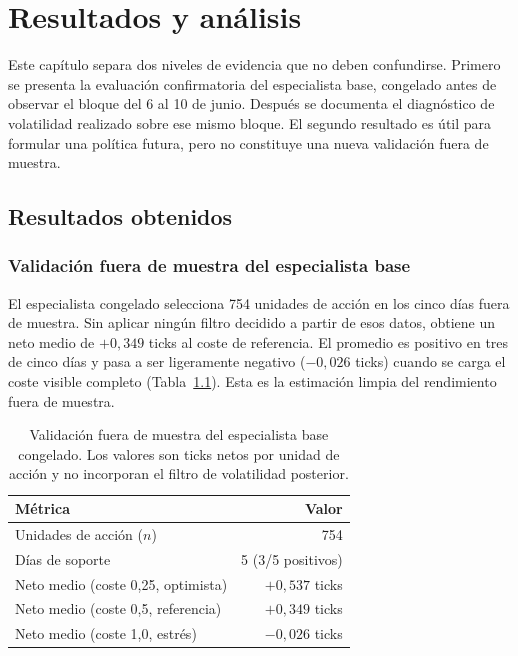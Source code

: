 %
\chapter{Resultados y análisis}
\label{ch::resultados}

Este capítulo separa dos niveles de evidencia que no deben confundirse. Primero se presenta
la evaluación confirmatoria del especialista base, congelado antes de observar el bloque del
6 al 10 de junio. Después se documenta el diagnóstico de volatilidad realizado sobre ese mismo
bloque. El segundo resultado es útil para formular una política futura, pero no constituye
una nueva validación fuera de muestra.

\section{Resultados obtenidos}

\subsection{Validación fuera de muestra del especialista base}

El especialista congelado selecciona 754 unidades de acción en los cinco días fuera de
muestra. Sin aplicar ningún filtro decidido a partir de esos datos, obtiene un neto medio de
$+0{,}349$ ticks al coste de referencia. El promedio es positivo en tres de cinco días y
pasa a ser ligeramente negativo ($-0{,}026$ ticks) cuando se carga el coste visible completo
(Tabla~\ref{tab:fresh}). Esta es la estimación limpia del rendimiento fuera de muestra.

\begin{table}[h]
\centering
\caption{Validación fuera de muestra del especialista base congelado. Los valores son ticks
netos por unidad de acción y no incorporan el filtro de volatilidad posterior.}
\label{tab:fresh}
\begin{tabular}{lr}
\toprule
\textbf{Métrica} & \textbf{Valor} \\
\midrule
Unidades de acción ($n$)                  & 754 \\
Días de soporte                          & 5 (3/5 positivos) \\
Neto medio (coste 0,25, optimista)         & $+0{,}537$ ticks \\
Neto medio (coste 0,5, referencia)         & $+0{,}349$ ticks \\
Neto medio (coste 1,0, estrés)             & $-0{,}026$ ticks \\
\bottomrule
\end{tabular}
\end{table}

